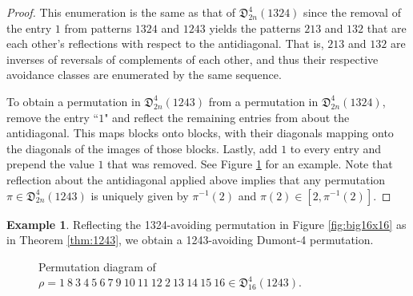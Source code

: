 \documentclass[
final
]{dmtcs-episciences}
\theoremstyle{definition}
\newtheorem{example}[theorem]{Example}
\theoremstyle{remark}
\begin{document}
\begin{proof}
This enumeration is the same as that of $\mathfrak{D}^4_{2n}(1324)$ since the removal of the entry $1$ from patterns $1324$ and $1243$ yields the patterns $213$ and $132$ that are each other's reflections with respect to the antidiagonal.  That is, $213$ and $132$ are inverses of reversals of complements of each other, and thus their respective avoidance classes are enumerated by the same sequence.

To obtain a permutation in $\mathfrak{D}^4_{2n}(1243)$ from a permutation in $\mathfrak{D}^4_{2n}(1324)$, remove the entry ``$1$" and reflect the remaining entries from  about the antidiagonal. This maps blocks onto blocks, with their diagonals mapping onto the diagonals of the images of those blocks.  Lastly, add $1$ to every entry and prepend the value $1$ that was removed. See Figure \ref{fig:big16x16_irc} for an example. Note that reflection about the antidiagonal applied above implies that any permutation $\pi\in\mathfrak{D}^4_{2n}(1243)$ is uniquely given by $\pi^{-1}(2)$ and $\pi(2)\in[2,\pi^{-1}(2)]$.
\end{proof}

\begin{example}
\label{example:D^4_16(1243)}
Reflecting the 1324-avoiding permutation in Figure \ref{fig:big16x16} as in Theorem \ref{thm:1243}, we obtain a 1243-avoiding Dumont-4 permutation.
%
%
\begin{figure}[!h]
\begin{center}
	\caption {Permutation diagram of
	$\rho = 	1\ 8\ 3\ 4\ 5\ 6\ 7\ 9\ 10\ 11\ 12\ 2\ 13\ 14\ 15\ 16 		
					\in \mathfrak{D}^4_{16}(1243)$.}
	\label{fig:big16x16_irc}
\end{center}
\end{figure}
\end{example}
\end{document}
